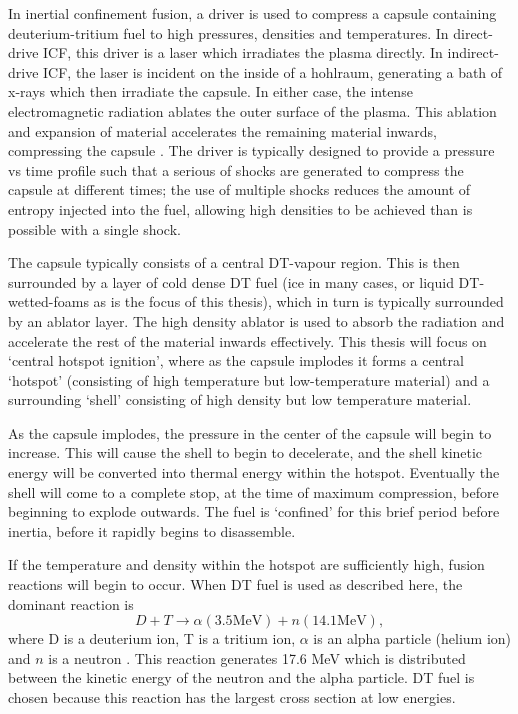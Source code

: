 In inertial confinement fusion, a driver is used to compress a capsule containing deuterium-tritium fuel to high pressures, densities and temperatures. In direct-drive ICF, this driver is a laser which irradiates the plasma directly. In indirect-drive ICF, the laser is incident on the inside of a hohlraum, generating a bath of x-rays which then irradiate the capsule. In either case, the intense electromagnetic radiation ablates the outer surface of the plasma. This ablation and expansion of material accelerates the remaining material inwards, compressing the capsule \cite{Atzeni2008}. The driver is typically designed to provide a pressure vs time profile such that a serious of shocks are generated to compress the capsule at different times; the use of multiple shocks reduces the amount of entropy injected into the fuel, allowing high densities to be achieved than is possible with a single shock.

The capsule typically consists of a central DT-vapour region. This is then surrounded by a layer of cold dense DT fuel (ice in many cases, or liquid DT-wetted-foams as is the focus of this thesis), which in turn is typically surrounded by an ablator layer. The high density ablator is used to absorb the radiation and accelerate the rest of the material inwards effectively. This thesis will focus on `central hotspot ignition', where as the capsule implodes it forms a central `hotspot' (consisting of high temperature but low-temperature material) and a surrounding `shell' consisting of high density but low temperature material.

As the capsule implodes, the pressure in the center of the capsule will begin to increase. This will cause the shell to begin to decelerate, and the shell kinetic energy will be converted into thermal energy within the hotspot. Eventually the shell will come to a complete stop, at the time of maximum compression, before beginning to explode outwards. The fuel is `confined' for this brief period before inertia, before it rapidly begins to disassemble. 

If the temperature and density within the hotspot are sufficiently high, fusion reactions will begin to occur. When DT fuel is used as described here, the dominant reaction is \begin{equation} D + T \rightarrow \alpha(3.5 \text{MeV}) + n(14.1 \text{MeV}), \end{equation} where D is a deuterium ion, T is a tritium ion, $\alpha$ is an alpha particle (helium ion) and $n$ is a neutron \cite{Atzeni2008}. This reaction generates 17.6 MeV which is distributed between the kinetic energy of the neutron and the alpha particle. DT fuel is chosen because this reaction has the largest cross section at low energies.

